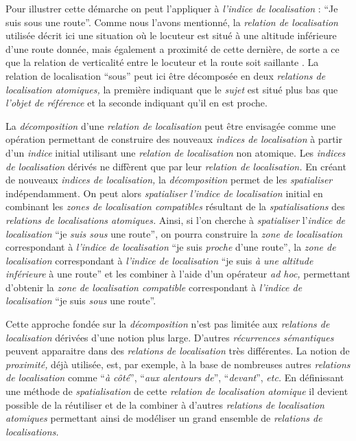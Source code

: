 Pour illustrer cette démarche on peut l'appliquer à \emph{l'indice de
  localisation} : \enquote{Je suis sous une route}. Comme nous l'avons
mentionné, la \emph{relation de localisation} utilisée décrit ici une
situation où le locuteur est situé à une altitude inférieure d'une
route donnée, mais également a proximité de cette dernière, de sorte a
ce que la relation de verticalité entre le locuteur et la route soit
saillante \autocite{Vandeloise1986}. La relation de localisation
\enquote{sous} peut ici être décomposée en deux \emph{relations de
  localisation atomiques,} la première indiquant que le \emph{sujet}
est situé plus bas que \emph{l'objet de référence} et la seconde
indiquant qu'il en est proche.

La \emph{décomposition} d'une \emph{relation de localisation} peut
être envisagée comme une opération permettant de construire des
nouveaux \emph{indices de localisation} à partir d'un \emph{indice}
initial utilisant une \emph{relation de localisation} non
atomique. Les \emph{indices de localisation} dérivés ne diffèrent que
par leur \emph{relation de localisation.} En créant de nouveaux
\emph{indices de localisation,} la \emph{décomposition} permet de les
\emph{spatialiser} indépendamment. On peut alors \emph{spatialiser}
\emph{l'indice de localisation} initial en combinant les \emph{zones
  de localisation compatibles} résultant de la \emph{spatialisations}
des \emph{relations de localisations atomiques.} Ainsi, si l'on
cherche à \emph{spatialiser} l'\emph{indice de localisation}
\enquote{je \emph{suis sous} une route}, on pourra construire la
\emph{zone de localisation} correspondant à \emph{l'indice de
  localisation} \enquote{je suis \emph{proche} d'une route}, la
\emph{zone de localisation} correspondant à \emph{l'indice de
  localisation} \enquote{je suis \emph{à une altitude inférieure} à
  une route} et les combiner à l'aide d'un opérateur \emph{ad hoc,}
permettant d'obtenir la \emph{zone de localisation compatible}
correspondant à \emph{l'indice de localisation} \enquote{je suis
  \emph{sous} une route}.

Cette approche fondée sur la \emph{décomposition} n'est pas limitée
aux \emph{relations de localisation} dérivées d'une notion plus
large. D'autres \emph{récurrences sémantiques} peuvent apparaitre dans
des \emph{relations de localisation} très différentes. La notion de
\emph{proximité,} déjà utilisée, est, par exemple, à la base de
nombreuses autres \emph{relations de localisation} comme
\enquote{\emph{à côté}}, \enquote{\emph{aux alentours de}},
\enquote{\emph{devant}}, \emph{etc.} En définissant une méthode de
\emph{spatialisation} de cette \emph{relation de localisation
  atomique} il devient possible de la réutiliser et de la combiner à
d'autres \emph{relations de localisation atomiques} permettant ainsi
de modéliser un grand ensemble de \emph{relations de localisations.}

